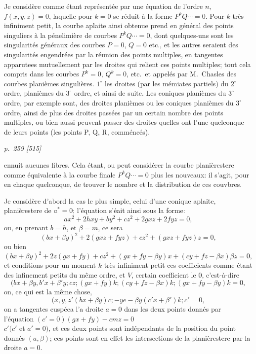 \documentclass[11pt,a4paper]{book}
\begin{document}
Je consid\`ere comme \'etant repr\'esent\'ee par une \'equation de l'ordre $n$, $f(x, y, z) = 0$,
laquelle pour $k = 0$ se r\'eduit \`a la forme $P^kQ \cdots = 0$.  Pour $k$ tr\`es infiniment petit,
la courbe aplaite ainsi obtenue prend en g\'en\'eral des points singuliers \`a la p\'enelimi\`ere de
courbes $P^kQ \cdots = 0$, dont quelques-uns sont les singularit\'es g\'en\'eraux des courbes
$P = 0$, $Q = 0$ etc., et les autres seraient des singularit\'es engendr\'ees par la r\'eunion des
points multiples, en tangentes apparutees mutuellement par les droites qui relient ces
points multiples; tout cela compris dans les courbes $P^k = 0$, $Q^k = 0$, etc.\ et appel\'es par
M.~Chasles des courbes plani\`emes singuli\`eres.  $1^{\circ}$ les droites (par les m\'emiates partiels) du
$2^{\circ}$ ordre, plani\`emes du $3^{\circ}$ ordre, et ainsi de suite.  Les coniques plani\`emes du $3^{\circ}$ ordre,
par exemple sont, des droites plani\`emes ou les coniques plani\`emes du $3^{\circ}$ ordre, ainsi de plus
des droites pass\'ees par un certain nombre des points multiples, ou bien aussi peuvent
passer des droites quelles ont l'une quelconque de leurs points (les points P, Q, R, comm\'enc\'es).

\clearpage

\bigskip
\textit{p.~259 [515]}
\smallskip

\noindent
ennuit aucunes fibres.  Cela \'etant, ou peut consid\'erer la courbe plani\`erestere comme
\'equivalente \`a la courbe finale $P^kQ \cdots = 0$ plus les nouveaux: il s'agit, pour en
chaque quelconque, de trouver le nombre et la distribution de ces couvbres.

Je consid\`ere d'abord la cas le plus simple, celui d'une conique aplaite, plani\`erestere
de $a^* = 0$; l'\'equation s'\'eait ainsi sous la forme:
\[
ax^2 + 2hxy + by^2 + cz^2 + 2gxz + 2fyz = 0,
\]
ou, en prenant $b = h$, et $\beta = m$, ce sera
\[
(bx + \beta y)^2 + 2(gxz + fyz) + c z^2 + (gxz + fyz)z = 0,
\]
ou bien
\[
(bx + \beta y)^2 + 2z(gx + fy) + cz^2 + (gx + fy - \beta y)x + (cy + fz - \beta x)\beta z = 0,
\]
et conditions pour un moment $k$ tr\`es infiniment petit ces coefficients comme \'etant des infinement
petits du m\^eme ordre, et $V$, certain coefficient le $0$, c'est-\`a-dire
\[
(bx + \beta y, b' x + \beta' y; cz; (gx + fy)k; (cy + fz - \beta x)k; (gx + fy - \beta y)k = 0,
\]
on, ce qui est la m\^eme chose,
\[
(x, y, z'(bx + \beta y)c; -ye - \beta y(c'x + \beta')k; c' = 0,
\]
on a tangentes cusp\'eea l'a droite $a = 0$ dans les deux points donn\'es par l'\'equation
$(c' = 0)(gx + fy) - cmz = 0$ \\
$c'(c'$ et $a' = 0)$, et ces deux points sont ind\'ependants de la position
du point donn\'es $(a, \beta)$; ces points sont en effet les intersections de la plani\`erestere par
la droite $a = 0$.
\end{document}
